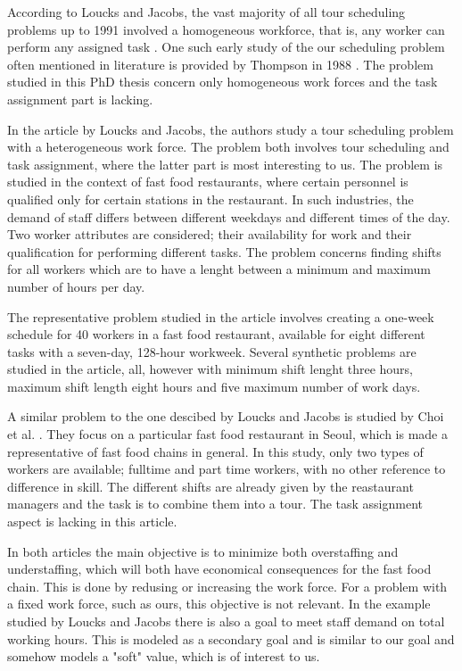 According to Loucks and Jacobs, the vast majority of all tour scheduling problems up to 1991 involved a homogeneous workforce, that is, any worker can perform any assigned task \citet{loucks_1991}. One such early study of the our scheduling problem often mentioned in literature is provided by Thompson in 1988 \citet{thompson_1988}. The problem studied in this PhD thesis concern only homogeneous work forces and the task assignment part is lacking.


In the article by Loucks and Jacobs, the authors study a tour scheduling problem with a heterogeneous work force. The problem both involves tour scheduling and task assignment, where the latter part is most interesting to us. The problem is studied in the context of fast food restaurants, where certain personnel is qualified only for certain stations in the restaurant. In such industries, the demand of staff differs between different weekdays and different times of the day. Two worker attributes are considered; their availability for work and their qualification for performing different tasks. The problem concerns finding shifts for all workers which are to have a lenght between a minimum and maximum number of hours per day.

The representative problem studied in the article involves creating a one-week schedule for 40 workers in a fast food restaurant, available for eight different tasks with a seven-day, 128-hour workweek. Several synthetic problems are studied in the article, all, however with minimum shift lenght three hours, maximum shift length eight hours and five maximum number of work days.

A similar problem to the one descibed by Loucks and Jacobs is studied by Choi et al. \citet{choi_hwang_park_2009}. They focus on a particular fast food restaurant in Seoul, which is made a representative of fast food chains in general. In this study, only two types of workers are available; fulltime and part time workers, with no other reference to difference in skill. The different shifts are already given by the reastaurant managers and the task is to combine them into a tour. The task assignment aspect is lacking in this article.


In both articles the main objective is to minimize both overstaffing and understaffing, which will both have economical consequences for the fast food chain. This is done by redusing or increasing the work force. For a problem with a fixed work force, such as ours, this objective is not relevant. In the example studied by Loucks and Jacobs there is also a goal to meet staff demand on total working hours. This is modeled as a secondary goal and is similar to our goal and somehow models a "soft" value, which is of interest to us.

